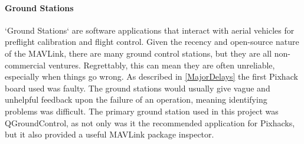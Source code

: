 \documentclass{article}
\begin{document}
\paragraph{Ground Stations}
`Ground Stations` are software applications that interact with aerial vehicles for preflight calibration and flight control. Given the recency and open-source nature of the MAVLink, there are many ground control stations, but they are all non-commercial ventures. Regrettably, this can mean they are often unreliable, especially when things go wrong. As described in \ref{MajorDelays} the first Pixhack board used was faulty. The ground stations would usually give vague and unhelpful feedback upon the failure of an operation, meaning identifying problems was difficult. The primary ground station used in this project was QGroundControl\cite{qGroundControl}, as not only was it the recommended application for Pixhacks, but it also provided a useful MAVLink package inspector. 
\end{document}
